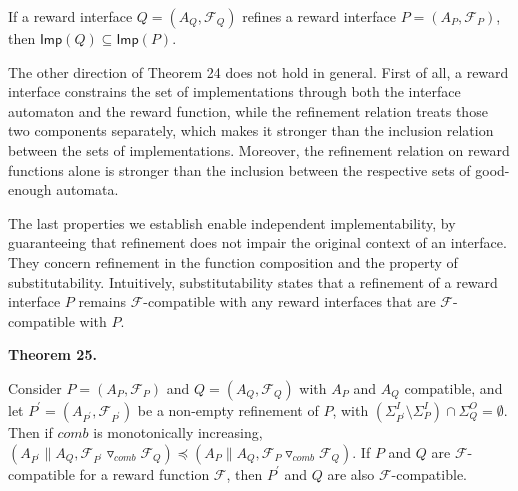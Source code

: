  
If a reward interface $Q=(A_{Q},\mathcal{F}_{Q})$ refines a reward interface $P=(A_{P},\mathcal{F}_{P})$, then $\mathsf{Imp}(Q)\subseteq\mathsf{Imp}(P)$.\par
 
 
 
 
The other direction of Theorem 24 does not hold in general. First of all, a reward interface constrains the set of implementations through both the interface automaton and the reward function, while the refinement relation treats those two components separately, which makes it stronger than the inclusion relation between the sets of implementations. Moreover, the refinement relation on reward functions alone is stronger than the inclusion between the respective sets of good-enough automata.\par
 
 
 
The last properties we establish enable independent implementability, by guaranteeing that refinement does not impair the original context of an interface. They concern refinement in the function composition and the property of substitutability. Intuitively, substitutability states that a refinement of a reward interface $P$ remains $\mathcal{F}$-compatible with any reward interfaces that are $\mathcal{F}$-compatible with $P$.\par
 
 
 
\par\medskip\noindent\textbf{Theorem 25.}\par
 
 
Consider $P=(A_{P},\mathcal{F}_{P})$ and $Q=(A_{Q},\mathcal{F}_{Q})$ with $A_{P}$ and $A_{Q}$ compatible, and let $P^{\prime}=(A_{P^{\prime}},\mathcal{F}_{P^{\prime}})$ be a non-empty refinement of $P$, with $(\Sigma_{P^{\prime}}^{I}\setminus\Sigma_{P}^{I})\cap\Sigma_{Q}^{O}=\emptyset$. Then if $\mathit{comb}$ is monotonically increasing, $(A_{P^{\prime}}\parallel A_{Q},{{\mathcal{F}_{P^{\prime}}}\mathbin{\triangledown_{\mathit{comb}}}{\mathcal{F}_{Q}}})\preceq(A_{P}\parallel A_{Q},{{\mathcal{F}_{P}}\mathbin{\triangledown_{\mathit{comb}}}{\mathcal{F}_{Q}}})$. If $P$ and $Q$ are $\mathcal{F}$-compatible for a reward function $\mathcal{F}$, then $P^{\prime}$ and $Q$ are also $\mathcal{F}$-compatible.\par
 

